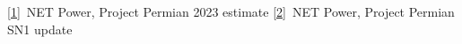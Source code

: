 \href{https://netpower.com/}{[1]}~NET Power, Project Permian 2023 estimate\quad
\href{https://netpower.com/}{[2]}~NET Power, Project Permian SN1 update
